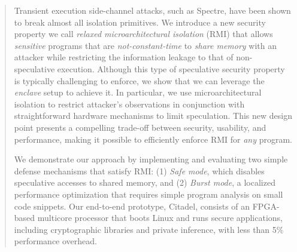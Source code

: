 \begin{abstract}
Transient execution side-channel attacks, such as Spectre, have been shown to break almost all isolation primitives.
We introduce a new security property we call \emph{relaxed microarchitectural isolation} (RMI) that allows \emph{sensitive} programs that are \emph{not-constant-time} to \emph{share memory} with an attacker while restricting the information leakage to that of non-speculative execution.
Although this type of speculative security property is typically challenging to enforce, we show that we can leverage the \emph{enclave} setup to achieve it.
In particular, we use microarchitectural isolation to restrict attacker's observations in conjunction with straightforward hardware mechanisms to limit speculation.
This new design point presents a compelling trade-off between security, usability, and performance, making it possible to efficiently enforce RMI for \emph{any} program.

We demonstrate our approach by implementing and evaluating two simple defense mechanisms that satisfy RMI: (1) \emph{Safe mode}, which disables speculative accesses to shared memory, and (2) \emph{Burst mode}, a localized performance optimization that requires simple program analysis on small code snippets.
Our end-to-end prototype, Citadel, consists of an FPGA-based multicore processor that boots Linux and runs secure applications, including cryptographic libraries and private inference, with less than 5\% performance overhead.
\end{abstract}